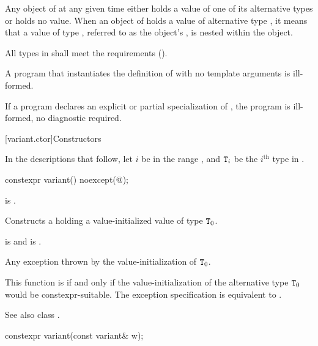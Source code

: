 \pnum
Any object of  at any given time either holds a value
of one of its alternative types or holds no value.
When an object of  holds a value of alternative type ,
it means that a value of type , referred to as the 
object's ,
is nested within the
 object.

\pnum
All types in  shall meet
the  requirements ().

\pnum
A program that instantiates the definition of  with
no template arguments is ill-formed.

\pnum
If a program declares an explicit or partial specialization of ,
the program is ill-formed, no diagnostic required.

[variant.ctor]{Constructors}

\pnum
In the descriptions that follow, let $i$ be in the range ,
and $\texttt{\protect T}_i$ be the $i^\text{th}$ type in .

%
\begin{itemdecl}
constexpr variant() noexcept(@\seebelow@);
\end{itemdecl}

\begin{itemdescr}
\pnum
\constraints
{} is .

\pnum
\effects
Constructs a  holding a value-initialized value of type $\texttt{\protect T}_0$.

\pnum
\ensures
{} is  and  is .

\pnum
\throws
Any exception thrown by the value-initialization of $\texttt{\protect T}_0$.

\pnum
\remarks
This function is  if and only if the
value-initialization of the alternative type $\texttt{\protect T}_0$
would be constexpr-suitable.
The exception specification is equivalent to
.
\begin{note}
See also class .
\end{note}
\end{itemdescr}

%
\begin{itemdecl}
constexpr variant(const variant& w);
\end{itemdecl}

